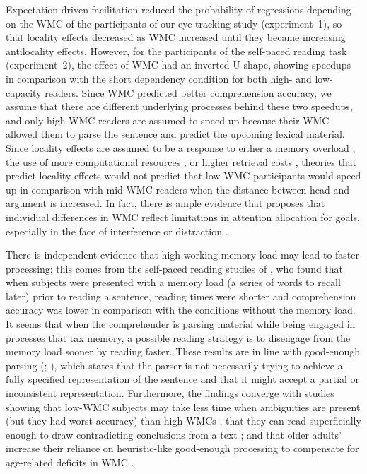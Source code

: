 \documentclass{frontiersSCNS}\usepackage{knitr}
\begin{document}
Expectation-driven facilitation reduced the probability of  regressions depending on the WMC of the participants of our eye-tracking study (experiment~1), so that locality effects decreased as WMC increased until they became increasing antilocality effects. However, for the participants of the self-paced reading task (experiment~2), the effect of WMC had an inverted-U shape, showing speedups in comparison with the short dependency condition for both high- and low-capacity readers. Since WMC predicted better comprehension accuracy, we assume that there are different underlying processes behind these two speedups, and only high-WMC readers are assumed to speed up because their WMC allowed them to parse the sentence and predict the upcoming lexical material. Since locality effects are assumed to be a response to  either a memory overload \citep{Gibson1998}, the use of more computational resources \citep{Gibson2000}, or higher retrieval costs \citep{VasishthLewis2006}, theories that predict locality effects would not predict that low-WMC participants would speed up in comparison with mid-WMC readers  when the distance between head and argument is increased. In fact, there is ample evidence that proposes that individual differences in WMC reflect limitations in attention allocation for  goals, especially in the face of interference or distraction \citep[for a review see][]{Engle2002}. 

There is independent evidence that high working memory load may lead to faster processing; this comes from the self-paced reading studies of \citet{VanDykeMcElree2006}, who found that when subjects were presented with a memory load (a series of words to recall later) prior to reading a sentence, reading times were shorter and comprehension accuracy  was lower in comparison with the conditions without the memory load. 
It seems that when the comprehender is parsing material while being engaged in processes that tax memory, a possible reading strategy is to disengage from the memory load sooner by reading faster. These results are in line with good-enough parsing (\citealp{FerreiraEtAl2002}; \citealp[for a review: ][]{FerreiraPatson2007}), which states that the parser is not necessarily trying to achieve a fully specified representation of the sentence and that it might accept a partial or  inconsistent representation. Furthermore, the findings converge with studies showing that low-WMC subjects may take less time when ambiguities are present (but they had worst accuracy) than high-WMCs \citep{MacDonaldEtAl1992,PearlmutterMacDonald1995, vonderMalsburgVasishth2012}, that they can read superficially enough to draw contradicting conclusions from a text \citep{OberauerEtAl2006}; and that older adults' increase their reliance on heuristic-like good-enough processing to compensate for age-related deficits in WMC \citep{ChristiansonWilliams2006}.
\end{document}
